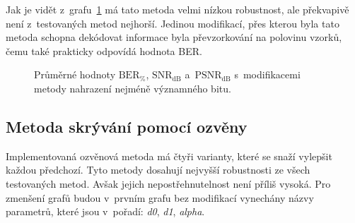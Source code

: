 Jak je vidět z~grafu~\ref{pic:modifications-mean-values-lsb} má tato metoda
velmi nízkou robustnost, ale překvapivě není z~testovaných metod nejhorší.
Jedinou modifikací, přes kterou byla tato metoda schopna dekódovat informace
byla převzorkování na polovinu vzorků, čemu také prakticky odpovídá hodnota
BER.

\begin{figure}[hbt]
    \table
    \centering
    \caption{Průměrné hodnoty $\mathrm{BER}_{\%}$, $\mathrm{SNR}_\mathrm{dB}$
    a~$\mathrm{PSNR}_\mathrm{dB}$ s~modifikacemi metody nahrazení nejméně
    významného bitu.}
    \label{pic:modifications-mean-values-lsb}
\end{figure}

\subsection*{Metoda skrývání pomocí ozvěny}

Implementovaná ozvěnová metoda má čtyři varianty, které se snaží vylepšit
každou předchozí. Tyto metody dosahují nejvyšší robustnosti ze všech
testovaných metod. Avšak jejich nepostřehnutelnost není příliš vysoká. Pro
zmenšení grafů budou v~prvním grafu bez modifikací vynechány názvy parametrů,
které jsou v~pořadí: \textit{d0}, \textit{d1}, \textit{alpha}.

